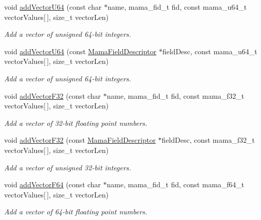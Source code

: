 \begin{DoxyCompactItemize}
void \hyperlink{classWombat_1_1MamaMsg_a1cc4ebf37d0be10414dd59cb264e8b79}{addVectorU64} (const char $\ast$name, mama\_\-fid\_\-t fid, const mama\_\-u64\_\-t vectorValues\mbox{[}$\,$\mbox{]}, size\_\-t vectorLen)
\begin{DoxyCompactList}\small\item\em Add a vector of unsigned 64-\/bit integers. \item\end{DoxyCompactList}\item 
void \hyperlink{classWombat_1_1MamaMsg_af591a7090ff6c799a08a6d2e35e6915b}{addVectorU64} (const \hyperlink{classWombat_1_1MamaFieldDescriptor}{MamaFieldDescriptor} $\ast$fieldDesc, const mama\_\-u64\_\-t vectorValues\mbox{[}$\,$\mbox{]}, size\_\-t vectorLen)
\begin{DoxyCompactList}\small\item\em Add a vector of unsigned 64-\/bit integers. \item\end{DoxyCompactList}\item 
void \hyperlink{classWombat_1_1MamaMsg_a72c7a6b15c12e825ce0f775925c74f58}{addVectorF32} (const char $\ast$name, mama\_\-fid\_\-t fid, const mama\_\-f32\_\-t vectorValues\mbox{[}$\,$\mbox{]}, size\_\-t vectorLen)
\begin{DoxyCompactList}\small\item\em Add a vector of 32-\/bit floating point numbers. \item\end{DoxyCompactList}\item 
void \hyperlink{classWombat_1_1MamaMsg_a1d0d0283c79b617c3d02cf20bc13c493}{addVectorF32} (const \hyperlink{classWombat_1_1MamaFieldDescriptor}{MamaFieldDescriptor} $\ast$fieldDesc, const mama\_\-f32\_\-t vectorValues\mbox{[}$\,$\mbox{]}, size\_\-t vectorLen)
\begin{DoxyCompactList}\small\item\em Add a vector of unsigned 32-\/bit integers. \item\end{DoxyCompactList}\item 
void \hyperlink{classWombat_1_1MamaMsg_a1c0a929a1f453a4d196157a48ede943d}{addVectorF64} (const char $\ast$name, mama\_\-fid\_\-t fid, const mama\_\-f64\_\-t vectorValues\mbox{[}$\,$\mbox{]}, size\_\-t vectorLen)
\begin{DoxyCompactList}\small\item\em Add a vector of 64-\/bit floating point numbers. \item\end{DoxyCompactList}\item 

\end{DoxyCompactItemize}
